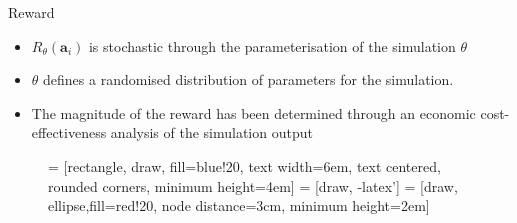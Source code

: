 \documentclass[10pt,usenames,dvipsnames]{beamer}
\begin{document}
\begin{frame}{Reward}

\begin{itemize}
\item $R_\theta(\bm{a}_i)$ is stochastic through the parameterisation of the simulation $\theta$
\item $\theta$ defines a randomised distribution of parameters for the simulation.
\item The magnitude of the reward has been determined through an economic cost-effectiveness analysis of the simulation output
\end{itemize}


\begin{figure}[!t]
\centering
{} = [rectangle, draw, fill=blue!20, 
    text width=6em, text centered, rounded corners, minimum height=4em]
 = [draw, -latex']
 = [draw, ellipse,fill=red!20, node distance=3cm,
    minimum height=2em]
    
\label{fig_flow}
\end{figure}

\end{frame}



\end{document}
